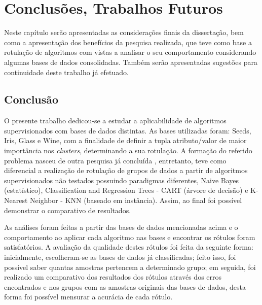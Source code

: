 \chapter{Conclusões, Trabalhos Futuros}\label{cap:conclusao} 

Neste capítulo serão apresentadas as considerações finais da dissertação, bem como a apresentação dos benefícios da pesquisa realizada, que teve como base a rotulação de algoritmos com vistas a analisar o seu comportamento considerando algumas bases de dados consolidadas. Também serão apresentadas sugestões para continuidade deste trabalho já efetuado. 

\section{Conclusão}\label{cond}



O presente trabalho dedicou-se a estudar a aplicabilidade de algoritmos supervisionados com bases de dados distintas. As bases utilizadas foram: Seeds, Iris, Glass e Wine, com a finalidade de definir a tupla atributo/valor de maior importância nos \textit{clusters}, determinando a sua rotulação. A formação do referido problema nasceu de outra pesquisa já concluída \cite{Lopes2016}, entretanto, teve como diferencial a realização de rotulação de grupos de dados a partir de algoritmos supervisionados não testados possuindo paradigmas diferentes, Naive Bayes (estatístico), Classification and Regression Trees - CART (árvore de decisão) e K-Nearest Neighbor - KNN (baseado em instância). Assim, ao final foi possível demonstrar o comparativo de resultados. 

As análises foram feitas a partir das bases de dados mencionadas acima e o comportamento ao aplicar cada algoritmo nas bases e encontrar os rótulos foram satisfatórios. A avaliação da qualidade destes rótulos foi feita da seguinte forma: inicialmente, escolheram-se as bases de dados já classificadas; feito isso, foi possível saber quantas amostras pertencem a determinado grupo; em seguida, foi realizado um comparativo dos resultados dos rótulos através dos erros encontrados e nos grupos com as amostras originais das bases de dados, desta forma foi possível mensurar a acurácia de cada rótulo. 


